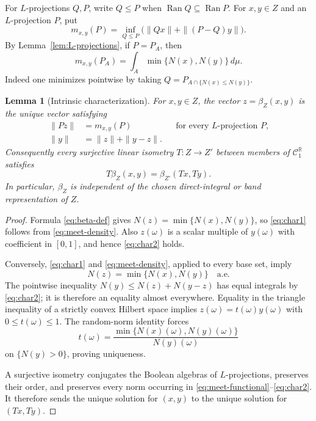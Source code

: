 \documentclass[11pt]{article}
\newcommand{\C}{\mathcal C}
\newcommand{\R}{\mathbb R}
\newcommand{\1}{\mathbf 1}
\newcommand{\Ran}{\operatorname{Ran}}
\newtheorem{lemma}[theorem]{Lemma}
\theoremstyle{definition}
\theoremstyle{remark}
\begin{document}
For $L$-projections $Q,P$, write $Q\leq P$ when $\Ran Q\subseteq\Ran P$.
For $x,y\in Z$ and an $L$-projection $P$, put
\begin{equation}
\label{eq:meet-functional}
 m_{x,y}(P)=
 \inf_{Q\leq P}\bigl(\|Qx\|+\|(P-Q)y\|\bigr).
\end{equation}
By Lemma~\ref{lem:L-projections}, if $P=P_A$, then
\begin{equation}
\label{eq:meet-density}
       m_{x,y}(P_A)=\int_A\min\{N(x),N(y)\}\,d\mu.
\end{equation}
Indeed one minimizes pointwise by taking
$Q=P_{A\cap\{N(x)\leq N(y)\}}$.

\begin{lemma}[Intrinsic characterization]
\label{lem:beta-intrinsic}
For $x,y\in Z$, the vector $z=\beta_Z(x,y)$ is the unique vector satisfying
\begin{align}
 \|Pz\|&=m_{x,y}(P)
          &&\text{for every $L$-projection $P$,}
 \label{eq:char1}\\
 \|y\|&=\|z\|+\|y-z\|.
 \label{eq:char2}
\end{align}
Consequently every surjective linear isometry $T:Z\to Z'$ between members
of $\C_1^{\R}$ satisfies
\[
                  T\beta_Z(x,y)=\beta_{Z'}(Tx,Ty).
\]
In particular, $\beta_Z$ is independent of the chosen direct-integral or
band representation of $Z$.
\end{lemma}

\begin{proof}
Formula \eqref{eq:beta-def} gives
$N(z)=\min\{N(x),N(y)\}$, so \eqref{eq:char1} follows from
\eqref{eq:meet-density}.  Also $z(\omega)$ is a scalar multiple of
$y(\omega)$ with coefficient in $[0,1]$, and hence \eqref{eq:char2} holds.

Conversely, \eqref{eq:char1} and \eqref{eq:meet-density}, applied to every
base set, imply
\[
                       N(z)=\min\{N(x),N(y)\}
                       \quad\text{a.e.}
\]
The pointwise inequality
$N(y)\leq N(z)+N(y-z)$ has equal integrals by \eqref{eq:char2}; it is
therefore an equality almost everywhere.  Equality in the triangle
inequality of a strictly convex Hilbert space implies
$z(\omega)=t(\omega)y(\omega)$ with $0\leq t(\omega)\leq1$.  The random-norm
identity forces
\[
       t(\omega)=\frac{\min\{N(x)(\omega),N(y)(\omega)\}}{N(y)(\omega)}
\]
on $\{N(y)>0\}$, proving uniqueness.

A surjective isometry conjugates the Boolean algebras of $L$-projections,
preserves their order, and preserves every norm occurring in
\eqref{eq:meet-functional}--\eqref{eq:char2}.  It therefore sends the unique
solution for $(x,y)$ to the unique solution for $(Tx,Ty)$.
\end{proof}
\end{document}
